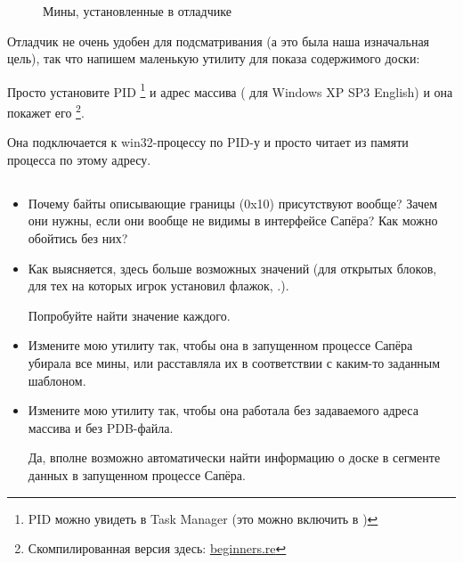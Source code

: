 \begin{figure}[H]
\centering
{}
\caption{Мины, установленные в отладчике}
\label{fig:minesweeper2}
\end{figure}

Отладчик не очень удобен для подсматривания (а это была наша изначальная цель), так что напишем маленькую
утилиту для показа содержимого доски:



Просто установите \ac{PID}
\footnote{PID можно увидеть в Task Manager 
(это можно включить в )} 
и адрес массива ( для Windows XP SP3 English) 
и она покажет его
\footnote{Скомпилированная версия здесь: 
\href{http://go.yurichev.com/17165}{beginners.re}}.

Она подключается к win32-процессу по \ac{PID}-у и просто читает из памяти процесса по этому адресу.

\subsection{\Exercises}

\begin{itemize}

\item
Почему байты описывающие границы (0x10) присутствуют вообще?
Зачем они нужны, если они вообще не видимы в интерфейсе Сапёра?
Как можно обойтись без них?

\item
Как выясняется, здесь больше возможных значений (для открытых блоков, для тех на которых игрок установил
флажок, \etc{}.).
	
Попробуйте найти значение каждого.

\item Измените мою утилиту так, чтобы она в запущенном процессе Сапёра убирала все мины, 
или расставляла их в соответствии с каким-то заданным шаблоном.

\item Измените мою утилиту так, чтобы она работала без задаваемого адреса массива и без \gls{PDB}-файла.

Да, вполне возможно автоматически найти информацию о доске в сегменте данных в запущенном процессе Сапёра.

%

\end{itemize}
